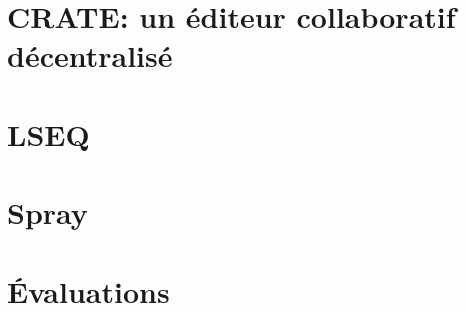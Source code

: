 
\chapter{CRATE: un éditeur collaboratif décentralisé}


\chapter{LSEQ}
\minitoc
\chapter{Spray}
\minitoc
\chapter{Évaluations}
\minitoc


